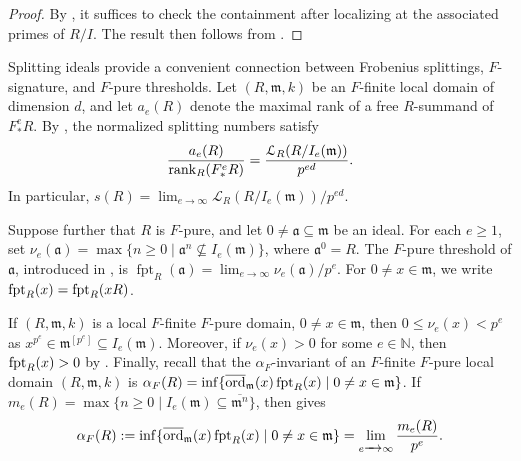 \documentclass[12pt]{amsart}
\numberwithin{equation}{theorem}
\theoremstyle{plain}
\newcommand{\fm}{\mathfrak{m}}
\newcommand{\NN}{\mathbb{N}}
\newcommand{\fa}{\mathfrak{a}}
\DeclareMathOperator{\Span}{Span}
\DeclareMathOperator{\FPT}{fpt}
\begin{document}
\begin{proof}
    By \cite[Lemma~2.6(f)]{PolstraUSTP}, it suffices to check the containment after localizing at the associated primes of $R/I$. The result then follows from \cite[Theorem~13.2.1 and Corollary~13.2.2]{HunekeSwanson2006}.
\end{proof}

Splitting ideals provide a convenient connection between Frobenius splittings, $F$-signature, and $F$-pure thresholds. Let $(R,\fm,k)$ be an $F$-finite local domain of dimension $d$, and let $a_e(R)$ denote the maximal rank of a free $R$-summand of $F^e_*R$. By \cite[Lemma~2.1 and Remark~2.3(1)]{Yao2006}, the normalized splitting numbers satisfy
\[
    \frac{a_e(R)}{\rank_R(F^e_*R)}
    =\frac{\mathcal{L}_R(R/I_e(\fm))}{p^{ed}}.
\]
In particular, $s(R)=\lim_{e\to\infty}\mathcal{L}_R(R/I_e(\fm))/p^{ed}$.

Suppose further that $R$ is $F$-pure, and let $0\not=\fa\subseteq\fm$ be an ideal. For each $e\geq 1$, set $\nu_e(\fa)=\max\{n\geq 0\mid \fa^n\not\subseteq I_e(\fm)\}$, where $\fa^0=R$. The $F$-pure threshold of $\fa$, introduced in \cite{MTW05,TW04}, is $\FPT_R(\fa)=\lim_{e\to\infty}\nu_e(\fa)/p^e$. For $0\not=x\in\fm$, we write $\fpt_R(x)=\FPT_R(xR)$.

If $(R,\fm,k)$ is a local $F$-finite $F$-pure domain, $0\not=x\in \fm$, then $0\leq \nu_e(x)<p^e$ as $x^{p^e}\in \fm^{[p^e]}\subseteq I_e(\fm)$. Moreover, if $\nu_e(x)>0$ for some $e\in\NN$, then $\operatorname{{fpt}}_R(x)>0$ by \cite[Proposition~2.2(3)]{TakagiWatanabe2004}. Finally, recall that the $\alpha_F$-invariant of an $F$-finite $F$-pure local domain $(R,\fm,k)$ is $\alpha_F(R)=\inf\{\overline{\ord}_{\fm}(x)\fpt_R(x)\mid 0\not=x\in\fm\}$. If $m_e(R)=\max\{n\geq 0\mid I_e(\fm)\subseteq\overline{\fm^n}\}$, then \cite[Proposition~3.7]{TY26} gives
\[
    \alpha_F(R):=\inf\{\overline{\ord}_{\fm}(x)\fpt_R(x)\mid 0\not=x\in\fm\}=\lim_{e\to\infty}\frac{m_e(R)}{p^e}.
\]

\end{document}
